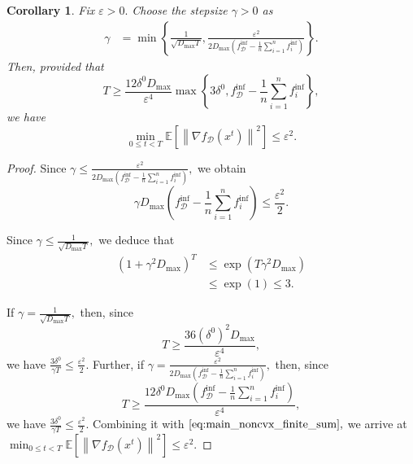\documentclass{article}
\newcommand{\bb}{\mathbb}
\newcommand{\Exp}[1]{{\bb E}\left[#1\right]}
\theoremstyle{plain}
\newtheorem{corollary}{Corollary}
\newcommand{\tf}{f_{\mathcal{D}}}
\theoremstyle{plain}
\theoremstyle{definition}
\theoremstyle{remark}
\begin{document}
\begin{corollary}
	Fix $\varepsilon>0.$ Choose the stepsize $\gamma>0$ as
	\begin{equation*}
		\begin{split}
			\gamma &= \min\left\lbrace \frac{1}{\sqrt{D_{\max} T}},\frac{\varepsilon^2}{2D_{\max}\left(\tf^{\inf} - \frac{1}{n}\sum_{i=1}^{n}f^{\inf}_i\right)} \right\rbrace.
		\end{split}
	\end{equation*}
	Then, provided that
	\begin{equation*}
		T\geq \frac{12\delta^0D_{\max}}{\varepsilon^4}\max\left\lbrace 3\delta^0, \tf^{\inf} - \frac{1}{n}\sum_{i=1}^{n}f^{\inf}_i\right\rbrace,
	\end{equation*}
	we have
	\begin{equation*}
		\min_{0 \leq t < T}\Exp{\left\|\nabla \tf(x^t)\right\|^2}\leq\varepsilon^2.
	\end{equation*}
\end{corollary}
\begin{proof}
	Since $\gamma \leq \frac{\varepsilon^2}{2D_{\max}\left(\tf^{\inf} - \frac{1}{n}\sum_{i=1}^{n}f^{\inf}_i\right)},$ we obtain
	\begin{equation*}
		\gamma D_{\max}\left(\tf^{\inf} - \frac{1}{n}\sum_{i=1}^{n}f^{\inf}_i\right) \leq \frac{\varepsilon^2}{2}.
	\end{equation*}

	Since $\gamma\leq \frac{1}{\sqrt{D_{\max} T}},$ we deduce that
	\begin{equation*}
		\begin{split}
			\left(1+\gamma^2D_{\max}\right)^T&\leq \exp\left(T\gamma^2D_{\max}\right)\\
			&\leq\exp(1)\leq 3.
		\end{split}
	\end{equation*}

	If $\gamma = \frac{1}{\sqrt{D_{\max} T}},$ then, since
	\begin{equation*}
		T\geq \frac{36\left(\delta^0\right)^2D_{\max}}{\varepsilon^4},
	\end{equation*}
	we have $\frac{3\delta^0}{\gamma T}\leq \frac{\varepsilon^2}{2}.$ Further, if $\gamma= \frac{\varepsilon^2}{2D_{\max}\left(\tf^{\inf} - \frac{1}{n}\sum_{i=1}^{n}f^{\inf}_i\right)},$ then, since
	\begin{equation*}
		T\geq \frac{12\delta^0D_{\max}\left(\tf^{\inf} - \frac{1}{n}\sum_{i=1}^{n}f^{\inf}_i\right)}{\varepsilon^4},
	\end{equation*}
	we have $\frac{3\delta^0}{\gamma T}\leq \frac{\varepsilon^2}{2}.$
	Combining it with $\eqref{eq:main_noncvx_finite_sum},$ we arrive at $\min_{0 \leq t < T}\Exp{\left\|\nabla \tf(x^t)\right\|^2}\leq\varepsilon^2.$
\end{proof}
\end{document}
